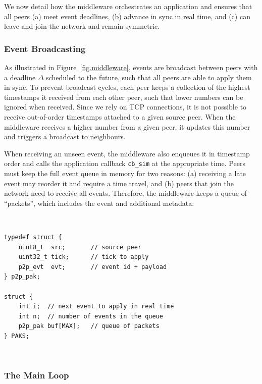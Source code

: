 \documentclass[sn-mathphys,iicol]{sn-jnl}%
\newcommand{\code}[1]  {\texttt{\small{#1}}}
\begin{document}
We now detail how the middleware orchestrates an application and ensures that
all peers
    (a) meet event deadlines,
    (b) advance in sync in real time, and
    (c) can leave and join the network and remain symmetric.

\subsubsection{Event Broadcasting}
\label{sec.tml.middleware.events}

As illustrated in Figure~\ref{fig.middleware}, events are broadcast between
peers with a deadline $\Delta$ scheduled to the future, such that all peers are
able to apply them in sync.
%
To prevent broadcast cycles, each peer keeps a collection of the highest
timestamps it received from each other peer, such that lower numbers can be
ignored when received.
Since we rely on TCP connections, it is not possible to receive out-of-order
timestamps attached to a given source peer.
When the middleware receives a higher number from a given peer, it updates this
number and triggers a broadcast to neighbours.
%

When receiving an unseen event, the middleware also enqueues it in timestamp
order and calls the application callback \code{cb\_sim} at the appropriate
time.
Peers must keep the full event queue in memory for two reasons:
    (a) receiving a late event may reorder it and require a time travel, and
    (b) peers that join the network need to receive all events.
%
Therefore, the middleware keeps a queue of ``packets'', which includes the
event and additional metadata:

{\footnotesize
~
\begin{verbatim}
typedef struct {
    uint8_t  src;       // source peer
    uint32_t tick;      // tick to apply
    p2p_evt  evt;       // event id + payload
} p2p_pak;

struct {
    int i;  // next event to apply in real time
    int n;  // number of events in the queue
    p2p_pak buf[MAX];   // queue of packets
} PAKS;
\end{verbatim}
~
}

\subsubsection{The Main Loop}
\label{sec.tml.middleware.loop}
\end{document}
